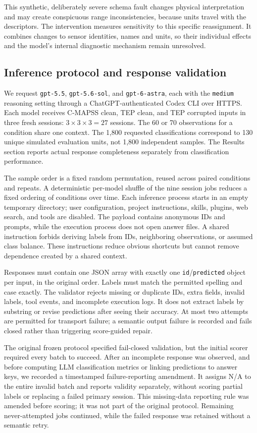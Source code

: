 \documentclass[11pt,a4paper]{article}
\begin{document}
This synthetic, deliberately severe schema fault changes physical interpretation and may create conspicuous range inconsistencies, because units travel with the descriptors. The intervention measures sensitivity to this specific reassignment. It combines changes to sensor identities, names and units, so their individual effects and the model's internal diagnostic mechanism remain unresolved.

\subsection{Inference protocol and response validation}
We request \texttt{gpt-5.5}, \texttt{gpt-5.6-sol}, and \texttt{gpt-6-astra}, each with the \texttt{medium} reasoning setting through a ChatGPT-authenticated Codex CLI over HTTPS. Each model receives C-MAPSS clean, TEP clean, and TEP corrupted inputs in three fresh sessions: $3\times3\times3=27$ sessions. The 60 or 70 observations for a condition share one context. The 1,800 requested classifications correspond to 130 unique simulated evaluation units, not 1,800 independent samples. The Results section reports actual response completeness separately from classification performance.

The sample order is a fixed random permutation, reused across paired conditions and repeats. A deterministic per-model shuffle of the nine session jobs reduces a fixed ordering of conditions over time. Each inference process starts in an empty temporary directory; user configuration, project instructions, skills, plugins, web search, and tools are disabled. The payload contains anonymous IDs and prompts, while the execution process does not open answer files. A shared instruction forbids deriving labels from IDs, neighboring observations, or assumed class balance. These instructions reduce obvious shortcuts but cannot remove dependence created by a shared context.

Responses must contain one JSON array with exactly one \texttt{id}/\texttt{predicted} object per input, in the original order. Labels must match the permitted spelling and case exactly. The validator rejects missing or duplicate IDs, extra fields, invalid labels, tool events, and incomplete execution logs. It does not extract labels by substring or revise predictions after seeing their accuracy. At most two attempts are permitted for transport failure; a semantic output failure is recorded and fails closed rather than triggering score-guided repair.

The original frozen protocol specified fail-closed validation, but the initial scorer required every batch to succeed. After an incomplete response was observed, and before computing LLM classification metrics or linking predictions to answer keys, we recorded a timestamped failure-reporting amendment. It assigns N/A to the entire invalid batch and reports validity separately, without scoring partial labels or replacing a failed primary session. This missing-data reporting rule was amended before scoring; it was not part of the original protocol. Remaining never-attempted jobs continued, while the failed response was retained without a semantic retry.
\end{document}
